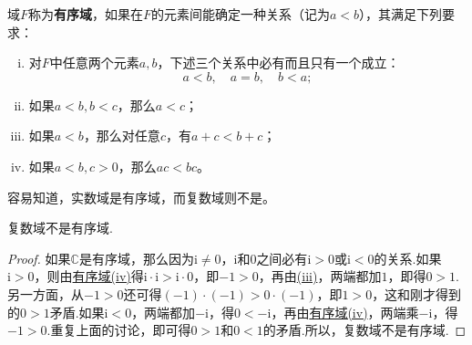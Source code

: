 \documentclass[../../main.tex]{subfiles}%
\begin{document}
\begin{definition}[有序域]\label{definition:有序域}
域\(F\)称为\textbf{有序域}，如果在\(F\)的元素间能确定一种关系（记为\(a < b\)），其满足下列要求：
\begin{enumerate}[(i)]
\item\label{有序域:(i)} 对\(F\)中任意两个元素\(a,b\)，下述三个关系中必有而且只有一个成立：
\[
a < b, \quad a = b, \quad b < a;
\]

\item\label{有序域:(ii)} 如果\(a < b, b < c\)，那么\(a < c\)；

\item\label{有序域:(iii)} 如果\(a < b\)，那么对任意\(c\)，有\(a + c < b + c\)；

\item\label{有序域:(iv)} 如果\(a < b, c > 0\)，那么\(ac < bc\)。
\end{enumerate}
\end{definition}
\begin{note}
容易知道，实数域是有序域，而复数域则不是。
\end{note}

\begin{theorem}\label{theorem:复数域不是有序域}
复数域不是有序域.
\end{theorem}
\begin{proof}
如果\(\mathbb{C}\)是有序域，那么因为\(\mathrm{i} \neq 0\)，\(\mathrm{i}\)和\(0\)之间必有\(\mathrm{i} > 0\)或\(\mathrm{i} < 0\)的关系.如果\(\mathrm{i} > 0\)，则由\hyperref[definition:有序域]{有序域(iv)}得\(\mathrm{i} \cdot \mathrm{i} > \mathrm{i} \cdot 0\)，即\(-1 > 0\)，再由\hyperref[有序域:(iii)]{(iii)}，两端都加\(1\)，即得\(0 > 1\).另一方面，从\(-1 > 0\)还可得\((-1) \cdot (-1) > 0 \cdot (-1)\)，即\(1 > 0\)，这和刚才得到的\(0 > 1\)矛盾.如果\(\mathrm{i} < 0\)，两端都加\(-\mathrm{i}\)，得\(0 < -\mathrm{i}\)，再由\hyperref[definition:有序域]{有序域(iv)}，两端乘\(-\mathrm{i}\)，得\(-1 > 0\).重复上面的讨论，即可得\(0 > 1\)和\(0 < 1\)的矛盾.所以，复数域不是有序域. 
\end{proof}
\end{document}
